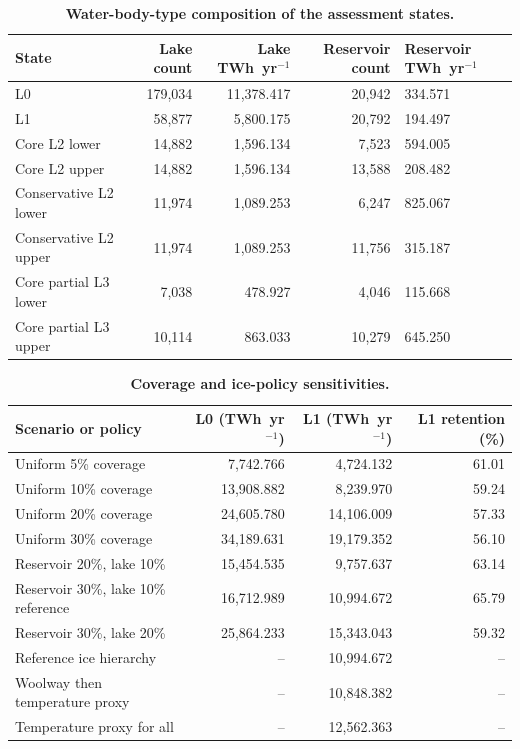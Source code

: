 \begin{table}[H]
\centering
\caption{\textbf{Water-body-type composition of the assessment states.}}
\label{tab:S5}
\scriptsize
\begin{tabularx}{\textwidth}{>{\RaggedRight\arraybackslash}Xrrr>{\RaggedRight\arraybackslash}X}
\toprule
State & Lake count & Lake TWh~yr$^{-1}$ & Reservoir count & Reservoir TWh~yr$^{-1}$ \\
\midrule
L0 & 179{,}034 & 11{,}378.417 & 20{,}942 & 5{,}334.571 \\
L1 & 58{,}877 & 5{,}800.175 & 20{,}792 & 5{,}194.497 \\
Core L2 lower & 14{,}882 & 1{,}596.134 & 7{,}523 & 2{,}594.005 \\
Core L2 upper & 14{,}882 & 1{,}596.134 & 13{,}588 & 3{,}208.482 \\
Conservative L2 lower & 11{,}974 & 1{,}089.253 & 6{,}247 & 1{,}825.067 \\
Conservative L2 upper & 11{,}974 & 1{,}089.253 & 11{,}756 & 2{,}315.187 \\
Core partial L3 lower & 7{,}038 & 478.927 & 4{,}046 & 1{,}115.668 \\
Core partial L3 upper & 10{,}114 & 863.033 & 10{,}279 & 2{,}645.250 \\
\bottomrule
\end{tabularx}
\end{table}

\begin{table}[H]
\centering
\caption{\textbf{Coverage and ice-policy sensitivities.}}
\label{tab:S6}
\scriptsize
\begin{tabular}{lrrr}
\toprule
Scenario or policy & L0 (TWh~yr$^{-1}$) & L1 (TWh~yr$^{-1}$) & L1 retention (\%) \\
\midrule
Uniform 5\% coverage & 7{,}742.766 & 4{,}724.132 & 61.01 \\
Uniform 10\% coverage & 13{,}908.882 & 8{,}239.970 & 59.24 \\
Uniform 20\% coverage & 24{,}605.780 & 14{,}106.009 & 57.33 \\
Uniform 30\% coverage & 34{,}189.631 & 19{,}179.352 & 56.10 \\
Reservoir 20\%, lake 10\% & 15{,}454.535 & 9{,}757.637 & 63.14 \\
Reservoir 30\%, lake 10\% reference & 16{,}712.989 & 10{,}994.672 & 65.79 \\
Reservoir 30\%, lake 20\% & 25{,}864.233 & 15{,}343.043 & 59.32 \\
\midrule
Reference ice hierarchy & -- & 10{,}994.672 & -- \\
Woolway then temperature proxy & -- & 10{,}848.382 & -- \\
Temperature proxy for all & -- & 12{,}562.363 & -- \\
\bottomrule
\end{tabular}
\end{table}

